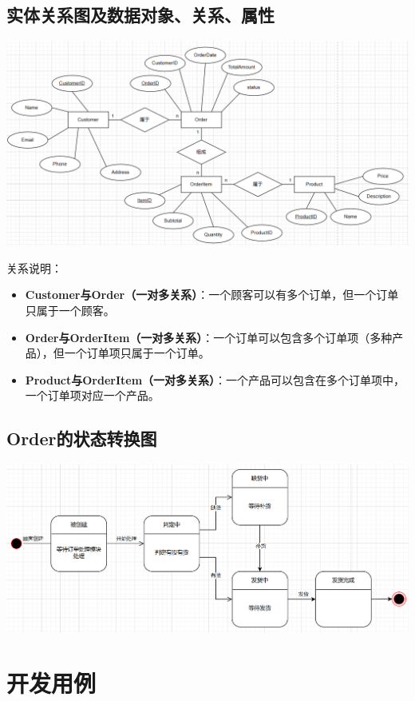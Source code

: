 \documentclass[11pt, a4paper, oneside]{ctexbook}
\begin{document}
\newpage
\section{实体关系图及数据对象、关系、属性}
\centering
\includegraphics[width=\textwidth]{3.png}
\label{fig:ER}
\raggedright
关系说明：
\begin{itemize}
    \item \textbf{Customer与Order（一对多关系）}：一个顾客可以有多个订单，但一个订单只属于一个顾客。
    \item \textbf{Order与OrderItem（一对多关系）}：一个订单可以包含多个订单项（多种产品），但一个订单项只属于一个订单。
    \item \textbf{Product与OrderItem（一对多关系）}：一个产品可以包含在多个订单项中，一个订单项对应一个产品。
\end{itemize}
\newpage

\section{Order的状态转换图}
\centering
\includegraphics[width=\textwidth]{4.png}
\label{fig:status}
\raggedright

\chapter{开发用例}
\end{document}
